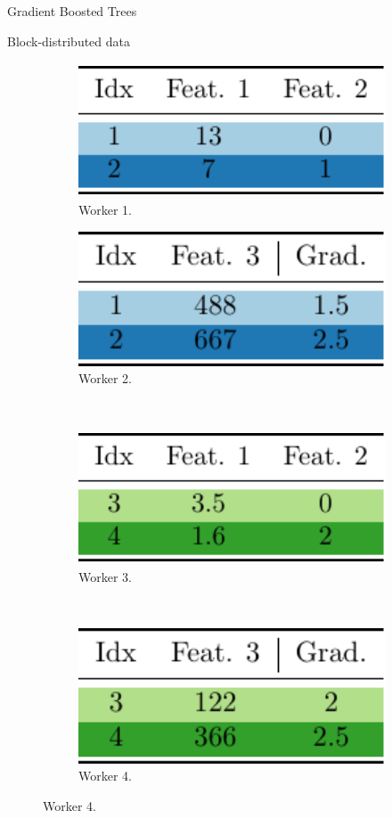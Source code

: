 \documentclass[final]{beamer}
\newlength{\onecolwid}
\begin{document}
\begin{frame}[t]
\begin{columns}[t]
\begin{column}{\onecolwid}
\begin{block}{Gradient Boosted Trees}
	\end{block}

\begin{block}{Block-distributed data}
	\begin{figure}
		\centering
		\begin{subfigure}[t]{0.45\onecolwid}
			\centering
			\includegraphics[height=4cm]{w1}
			\caption{Worker 1.}
		\end{subfigure}
		\quad
		\begin{subfigure}[t]{0.45\onecolwid}
			\centering
			\includegraphics[height=4cm]{w2}
			\caption{Worker 2.}
		\end{subfigure}
		\\
		\vspace{15pt}
		\begin{subfigure}[t]{0.45\onecolwid}
			\centering
			\includegraphics[height=4cm]{w3}
			\caption{Worker 3.}
		\end{subfigure}
		~
		\begin{subfigure}[t]{0.45\onecolwid}
			\centering
			\includegraphics[height=4cm]{w4}
			\caption{Worker 4.}
		\end{subfigure}
	\end{figure}
	

\end{block}
\end{column}
\end{columns}
\end{frame}
\end{document}
